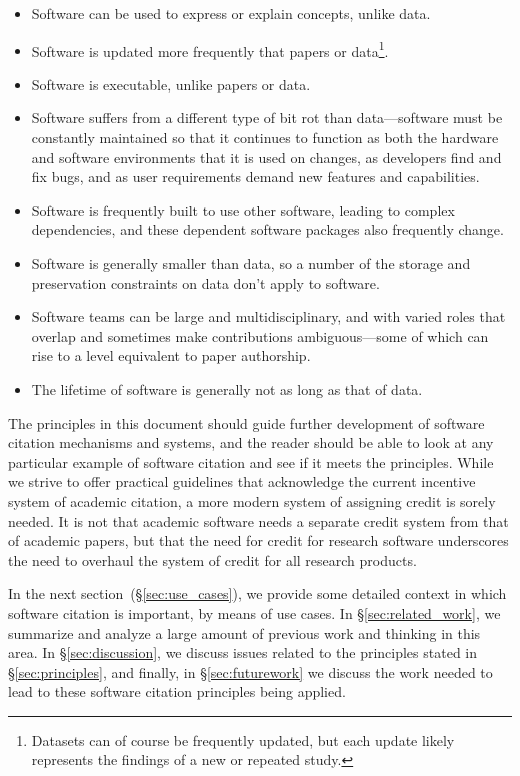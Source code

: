 \documentclass[12pt, oneside]{amsart}
\begin{document}
\begin{itemize}
\item Software can be used to express or explain concepts, unlike data.
\item Software is updated more frequently that papers or data\footnote{Datasets
can of course be frequently updated, but each update likely represents the
findings of a new or repeated study.}.
\item Software is executable, unlike papers or data.
\item Software suffers from a different type of bit rot than data---software
must be constantly maintained so that it continues to function as both the
hardware and software environments that it is used on changes, as developers
find and fix bugs, and as user requirements demand new features and capabilities.
\item Software is frequently built to use other software, leading to complex
dependencies, and these dependent software packages also frequently change.
\item Software is generally smaller than data, so a number of the storage and
preservation constraints on data don't apply to software.
\item Software teams can be large and multidisciplinary, and with varied roles
that overlap and sometimes make contributions ambiguous---some of which
can rise to a level equivalent to paper authorship.
\item The lifetime of software is generally not as long as that of data.
\end{itemize}

The principles in this document should guide further development of software citation
mechanisms and systems, and the reader should be able to look at any particular example
of software citation and see if it meets the principles.
While we strive to offer practical guidelines that acknowledge the current
incentive system of academic citation, a more modern system of assigning credit
is sorely needed. It is not that academic software needs a separate credit
system from that of academic papers, but that the need for credit for
research software underscores the need to overhaul the system of credit for
all research products.

In the next section~(\S\ref{sec:use_cases}), we provide some detailed context in
which software citation is important, by means of use cases. In
\S\ref{sec:related_work}, we summarize and analyze a large amount of previous
work and thinking in this area. In \S\ref{sec:discussion}, we discuss issues
related to the principles stated in \S\ref{sec:principles}, and finally, in
\S\ref{sec:futurework} we discuss the work needed to lead to these
software citation principles being applied.
\end{document}
